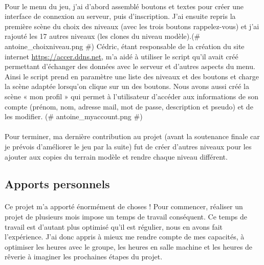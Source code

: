 \documentclass[titlepage, 13px, a4paper]{report}
\begin{document}
\paragraph{} \hspace{0pt} 
Pour le menu du jeu, j'ai d'abord assemblé boutons et textes pour créer une
interface de connexion au serveur, puis d'inscription. J'ai ensuite repris la première
scène du choix des niveaux (avec les trois boutons rappelez-vous) et j'ai rajouté
les 17 autres niveaux (les clones du niveau modèle).\@(\# antoine\_choixniveau.png \#)\@
Cédric, étant responsable de la création du site internet \url{https://accer.ddns.net}, 
m'a aidé à utiliser le script qu'il avait créé permettant 
d'échanger des données avec le serveur et d'autres aspects du menu. Ainsi le script prend
en paramètre une liste des niveaux et des boutons et charge la scène adaptée
lorsqu'on clique sur un des boutons. Nous avons aussi créé la scène « mon
profil » qui permet à l'utilisateur d'accéder aux informations de son compte
(prénom, nom, adresse mail, mot de passe, description et pseudo) et de les
modifier. \@(\# antoine\_myaccount.png \#)\@ \\


\paragraph{} \hspace{0pt} 
Pour terminer, ma dernière contribution au projet (avant la soutenance finale car je
prévois d'améliorer le jeu par la suite) fut de créer d'autres niveaux pour les
ajouter aux copies du terrain modèle et rendre chaque niveau différent. \\


\subsection{Apports personnels}
\paragraph{} \hspace{0pt}
Ce projet m'a apporté énormément de choses ! Pour commencer, réaliser un projet
de plusieurs mois impose un temps de travail conséquent. Ce temps de travail est
d'autant plus optimisé qu'il est régulier, nous en avons fait l'expérience. J'ai donc
appris à mieux me rendre compte de mes capacités, à optimiser les heures avec le
groupe, les heures en salle machine et les heures de rêverie à imaginer les
prochaines étapes du projet. \\
\end{document}
